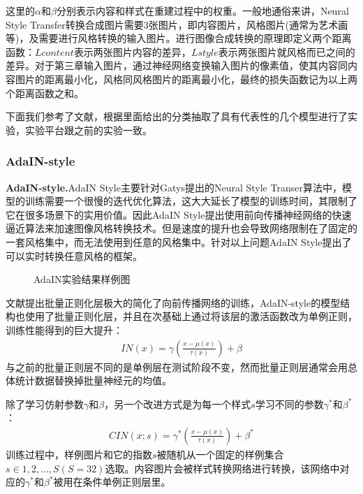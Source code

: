 这里的$\alpha$和$\beta$分别表示内容和样式在重建过程中的权重。一般地通俗来讲，Neural Style Transfer转换合成图片需要3张图片，即内容图片，风格图片(通常为艺术画等)，及需要进行风格转换的输入图片。进行图像合成转换的原理即定义两个距离函数：$Lcontent$表示两张图片内容的差异，$Lstyle$表示两张图片就风格而已之间的差异。对于第三章输入图片，通过神经网络变换输入图片的像素值，使其内容同内容图片的距离最小化，风格同风格图片的距离最小化，最终的损失函数记为以上两个距离函数之和。 

下面我们参考了文献\cite{nst-survey}，根据里面给出的分类抽取了具有代表性的几个模型进行了实验，实验平台跟之前的实验一致。

\subsubsection[AdaIN-style]{AdaIN-style}

\textbf{AdaIN-style.}\cite{adain}\quad AdaIN Style主要针对Gatys提出的Neural Style Transer算法中，模型的训练需要一个很慢的迭代优化算法，这大大延长了模型的训练时间，其限制了它在很多场景下的实用价值。因此AdaIN Style提出使用前向传播神经网络的快速逼近算法来加速图像风格转换技术。但是速度的提升也会导致网络限制在了固定的一套风格集中，而无法使用到任意的风格集中。针对以上问题AdaIN Style提出了可以实时转换任意风格的框架。

\begin{figure}[!hb]
    \centering
    \caption{AdaIN实验结果样例图}
    \label{fig:adin}
\end{figure}

文献\cite{ioffe}提出批量正则化层极大的简化了向前传播网络的训练，AdaIN-style的模型结构也使用了批量正则化层，并且在次基础上通过将该层的激活函数改为单例正则，训练性能得到的巨大提升：
\begin{align}
    IN(x)=\gamma(\frac{x-\mu(x)}{\tau(x)})+\beta
\end{align}
与之前的批量正则层不同的是单例层在测试阶段不变，然而批量正则层通常会用总体统计数据替换掉批量神经元的均值。

除了学习仿射参数$\gamma$和$\beta$，另一个改进方式是为每一个样式$s$学习不同的参数$\gamma^*$和$\beta^*$：
\begin{align}
    CIN(x;s)=\gamma^*(\frac{x-\mu(x)}{\tau(x)})+\beta^*
\end{align}
训练过程中，样例图片和它的指数$s$被随机从一个固定的样例集合$s\in {1,2,\dots,S}(S=32)$选取。内容图片会被样式转换网络进行转换，该网络中对应的$\gamma^*$和$\beta^*$被用在条件单例正则层里。

